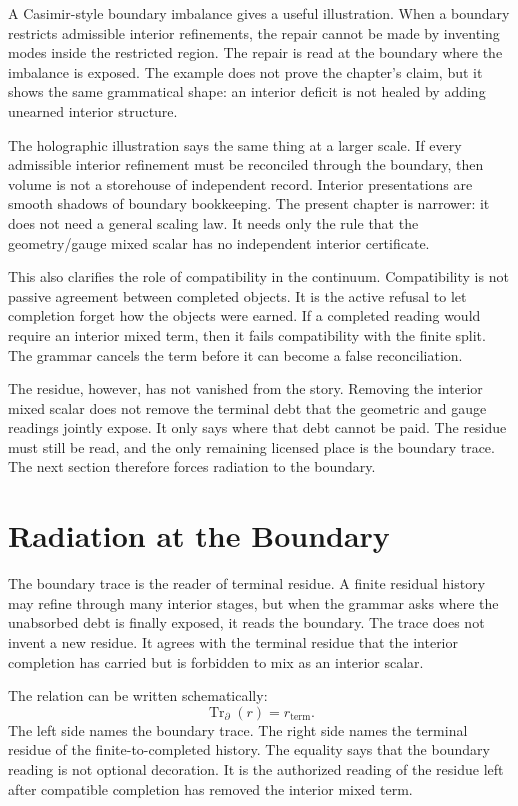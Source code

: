 A Casimir-style boundary imbalance gives a useful illustration. When a
boundary restricts admissible interior refinements, the repair cannot be
made by inventing modes inside the restricted region. The repair is read at
the boundary where the imbalance is exposed. The example does not prove the
chapter's claim, but it shows the same grammatical shape: an interior
deficit is not healed by adding unearned interior structure.

The holographic illustration says the same thing at a larger scale. If every
admissible interior refinement must be reconciled through the boundary, then
volume is not a storehouse of independent record. Interior presentations are
smooth shadows of boundary bookkeeping. The present chapter is narrower: it
does not need a general scaling law. It needs only the rule that the
geometry/gauge mixed scalar has no independent interior certificate.

This also clarifies the role of compatibility in the continuum. Compatibility
is not passive agreement between completed objects. It is the active refusal
to let completion forget how the objects were earned. If a completed reading
would require an interior mixed term, then it fails compatibility with the
finite split. The grammar cancels the term before it can become a false
reconciliation.

The residue, however, has not vanished from the story. Removing the interior
mixed scalar does not remove the terminal debt that the geometric and gauge
readings jointly expose. It only says where that debt cannot be paid. The
residue must still be read, and the only remaining licensed place is the
boundary trace. The next section therefore forces radiation to the boundary.

\section{Radiation at the Boundary}

The boundary trace is the reader of terminal residue. A finite residual
history may refine through many interior stages, but when the grammar asks
where the unabsorbed debt is finally exposed, it reads the boundary. The
trace does not invent a new residue. It agrees with the terminal residue that
the interior completion has carried but is forbidden to mix as an interior
scalar.

The relation can be written schematically:
\[
  \operatorname{Tr}_{\partial}(r) = r_{\mathrm{term}} .
\]
The left side names the boundary trace. The right side names the terminal
residue of the finite-to-completed history. The equality says that the
boundary reading is not optional decoration. It is the authorized reading of
the residue left after compatible completion has removed the interior mixed
term.

